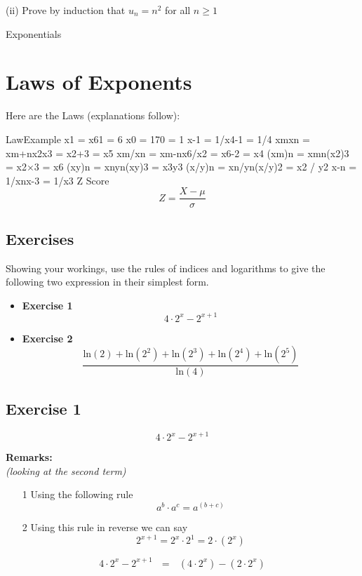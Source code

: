 \documentclass[]{report}
\begin{document}
\begin{enumerate}
(ii) Prove by induction that $u_n = n^2$ for all $n \geq 1$

Exponentials

\section{Laws of Exponents}
Here are the Laws (explanations follow):

LawExample
x1 = x61 = 6
x0 = 170 = 1
x-1 = 1/x4-1 = 1/4
xmxn = xm+nx2x3 = x2+3 = x5
xm/xn = xm-nx6/x2 = x6-2 = x4
(xm)n = xmn(x2)3 = x2×3 = x6
(xy)n = xnyn(xy)3 = x3y3
(x/y)n = xn/yn(x/y)2 = x2 / y2
x-n = 1/xnx-3 = 1/x3
Z Score
\[ Z = \frac{X - \mu}{\sigma} \]






\subsection{Exercises}

Showing your workings, use the rules of indices and logarithms to give the following two expression in their simplest form.
\bigskip
\begin{itemize}
\item \textbf{Exercise 1}
\[ 4 \cdot 2^x - 2^{x+1} \]
\item \textbf{Exercise 2}
\[  \frac{\mbox{ln}(2) + \mbox{ln}(2^2) + \mbox{ln}(2^3)  + \mbox{ln}(2^4) + \mbox{ln}(2^5)  }  {\mbox{ln}(4)}  \]
\end{itemize}

\subsection{Exercise 1}

\[ 4 \cdot 2^x - 2^{x+1} \]

\textbf{Remarks:}\\
\textit{(looking at the second term)}
\begin{itemize}
\item[1] Using the following rule
\[ a^b \cdot a^c = a^{(b+c)}  \] 
\item[2] Using this rule in reverse we can say
\[ 2^{x+1} = 2^x \cdot 2^1  = 2\cdot (2^x) \] 
\end{itemize}
\[ 4 \cdot 2^x - 2^{x+1} \mbox{   } = \mbox{   } (4 \cdot 2^x) -  (2\cdot 2^{x}) \]


\end{enumerate}
\end{document}
